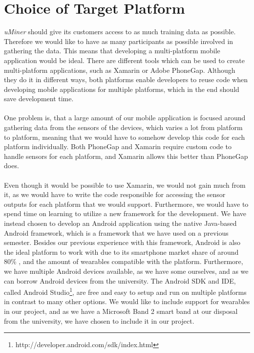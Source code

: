 
\section{Choice of Target Platform}
\label{sec:choice_of_platform}

\emph{uMiner} should give its customers access to as much training data as possible. Therefore we would like to have as many participants as possible involved in gathering the data. This means that developing a multi-platform mobile application would be ideal. There are different tools which can be used to create multi-platform applications, such as Xamarin or Adobe PhoneGap. Although they do it in different ways, both platforms enable developers to reuse code when developing mobile applications for multiple platforms, which in the end should save development time. 
\\\\
One problem is, that a large amount of our mobile application is focused around gathering data from the sensors of the devices, which varies a lot from platform to platform, meaning that we would have to somehow develop this code for each platform individually. Both PhoneGap and Xamarin require custom code to handle sensors for each platform, and Xamarin allows this better than PhoneGap does. 
\\\\
Even though it would be possible to use Xamarin, we would not gain much from it, as we would have to write the code responsible for accessing the sensor outputs for each platform that we would support. Furthermore, we would have to spend time on learning to utilize a new framework for the development. We have instead chosen to develop an Android application using the native Java-based Android framework, which is a framework that we have used on a previous semester. Besides our previous experience with this framework, Android is also the ideal platform to work with due to its smartphone market share of around 80\% \parencite{android_os_market_share}, and the amount of wearables compatible with the platform. Furthermore, we have multiple Android devices available, as we have some ourselves, and as we can borrow Android devices from the university. The Android SDK and IDE, called Android Studio\footnote{http://developer.android.com/sdk/index.html}, are free and easy to setup and run on multiple platforms in contrast to many other options. We would like to include support for wearables in our project, and as we have a Microsoft Band 2 smart band at our disposal from the university, we have chosen to include it in our project.
